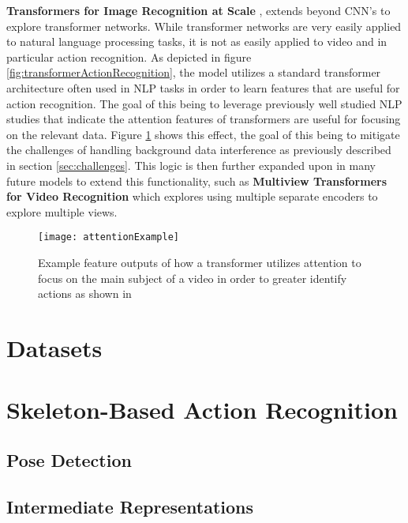 \textbf{Transformers for Image Recognition at Scale} \cite{transformer_og}, extends beyond CNN's to explore transformer networks. While transformer networks are very easily applied to natural language processing tasks, it is not as easily applied to video and in particular action recognition. As depicted in figure \ref{fig:transformerActionRecognition}, the model utilizes a standard transformer architecture often used in NLP tasks in order to learn features that are useful for action recognition. The goal of this being to leverage previously well studied NLP studies that indicate the attention features of transformers are useful for focusing on the relevant data. Figure \ref{fig:attentionExample} shows this effect, the goal of this being to mitigate the challenges of handling background data interference as previously described in section \ref{sec:challenges}. This logic is then further expanded upon in many future models to extend this functionality, such as \textbf{Multiview Transformers for Video Recognition} which explores using multiple separate encoders to explore multiple views.

\begin{figure}[h]
	\texttt{[image: attentionExample]}
	\centering
	\caption{Example feature outputs of how a transformer utilizes attention to focus on the main subject of a video in order to greater identify actions as shown in \cite{transformer_og}}
	\label{fig:attentionExample}
\end{figure}



\section{Datasets}

\section{Skeleton-Based Action Recognition}

\subsection{Pose Detection}

\subsection{Intermediate Representations}
